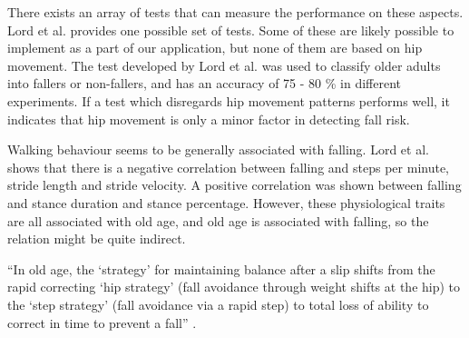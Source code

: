 There exists an array of tests that can measure the performance on these aspects. Lord et al. \cite{LMTassessPrev} provides one possible set of tests. Some of these are likely possible to implement as a part of our application, but none of them are based on hip movement.
	The test developed by Lord et al. \cite{LMTassessPrev} was used to classify older adults into fallers or non-fallers, and has an accuracy of 75 - 80 \% in different experiments. If a test which disregards hip movement patterns performs well, it indicates that hip movement is only a minor factor in detecting fall risk.

Walking behaviour seems to be generally associated with falling. Lord et al. \cite{LLKgaitPatterns} shows that there is a negative correlation between falling and steps per minute, stride length and stride velocity. A positive correlation was shown between falling and stance duration and stance percentage. However, these physiological traits are all associated with old age, and old age is associated with falling, so the relation might be quite indirect.

“In old age, the ‘strategy’ for maintaining balance after a slip shifts from the rapid correcting ‘hip strategy’ (fall avoidance through weight shifts at the hip) to the ‘step strategy’ (fall avoidance via a rapid step) to total loss of ability to correct in time to prevent a fall” \cite{fallsRubenstein}.